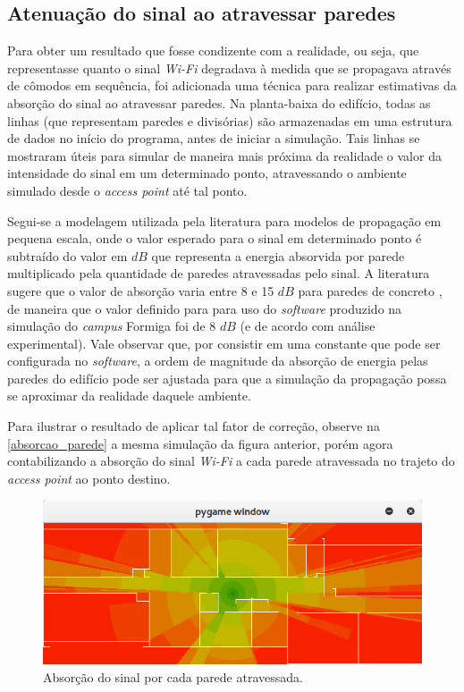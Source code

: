 \documentclass[
	12pt,				%
	twoside,			%
	a4paper,			%
	english,			%
	french,				%
	spanish,			%
	brazil				%
	]{abntex2}
\begin{document}
\subsection{Atenuação do sinal ao atravessar
paredes}\label{atenuauxe7uxe3o-do-sinal-ao-atravessar-paredes}

Para obter um resultado que fosse condizente com a realidade, ou seja,
que representasse quanto o sinal \emph{Wi-Fi} degradava à medida que se
propagava através de cômodos em sequência, foi adicionada uma técnica
para realizar estimativas da absorção do sinal ao atravessar paredes. Na
planta-baixa do edifício, todas as linhas (que representam paredes e
divisórias) são armazenadas em uma estrutura de dados no início do
programa, antes de iniciar a simulação. Tais linhas se mostraram úteis
para simular de maneira mais próxima da realidade o valor da intensidade
do sinal em um determinado ponto, atravessando o ambiente simulado desde
o \emph{access point} até tal ponto.

Segui-se a modelagem utilizada pela literatura para modelos de
propagação em pequena escala, onde o valor esperado para o sinal em
determinado ponto é subtraído do valor em \(dB\) que representa a
energia absorvida por parede multiplicado pela quantidade de paredes
atravessadas pelo sinal. A literatura sugere que o valor de absorção
varia entre 8 e 15 \(dB\) para paredes de concreto \cite{RAPPAPORT}, de
maneira que o valor definido para para uso do \emph{software} produzido
na simulação do \emph{campus} Formiga foi de 8 \(dB\) (e de acordo com
análise experimental). Vale observar que, por consistir em uma constante
que pode ser configurada no \emph{software}, a ordem de magnitude da
absorção de energia pelas paredes do edifício pode ser ajustada para que
a simulação da propagação possa se aproximar da realidade daquele
ambiente.

Para ilustrar o resultado de aplicar tal fator de correção, observe na
\autoref{absorcao_parede} a mesma simulação da figura anterior, porém
agora contabilizando a absorção do sinal \emph{Wi-Fi} a cada parede
atravessada no trajeto do \emph{access point} ao ponto destino.

\begin{figure}[ht]
    \caption{\label{absorcao_parede} Absorção do sinal por cada parede atravessada.}
    \begin{center}
        \includegraphics[scale=0.7]{imagens/absorcao-parede.jpg}
    \end{center}
\end{figure}
\end{document}
